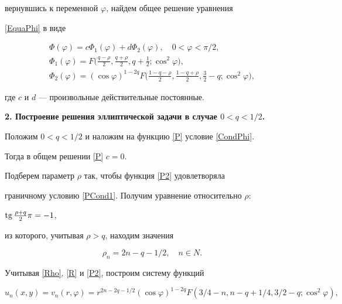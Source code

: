 вернувшись к переменной $\varphi$, найдем общее решение уравнения


\eqref{EquaPhi} в виде


\begin{gather}\label{P}


\Phi(\varphi)=c\Phi_1(\varphi)+d\Phi_2(\varphi),\quad 0<\varphi<\pi/2,\\


%


\label{P1}


\Phi_1(\varphi)=F\bigg(\frac{q-\rho}{2},\frac{q+\rho}{2},q+\frac{1}{2};


\cos^2\varphi\bigg),\\


%


\label{P2}


\Phi_2(\varphi)=(\cos\varphi)^{1-2q}F\bigg(\frac{1-q-\rho}{2},


\frac{1-q+\rho}{2},\frac{3}{2}-q;\cos^2\varphi\bigg),


\end{gather}


где $c$ и $d$ --- произвольные действительные постоянные.


\medskip





{\bf 2. Построение решения эллиптической задачи в случае $0<q<1/2$.}


Положим $0<q<1/2$ и наложим на функцию \eqref{P} условие \eqref{CondPhi}.


Тогда в общем решении \eqref{P} $c=0$.


Подберем параметр $\rho$ так, чтобы функция \eqref{P2} удовлетворяла


граничному условию \eqref{PCond1}. Получим уравнение относительно $\rho$:


$\operatorname{tg}\frac{\rho+q}{2}\pi = -1$,


из которого, учитывая $\rho>q$, находим значения


\begin{equation}\label{Rho}


\rho_n=2n-q-1/2,\quad n\in N.


\end{equation}





Учитывая \eqref{Rho}, \eqref{R} и \eqref{P2}, построим систему функций


\begin{equation}\label{SolveEn}


u_n(x,y)=v_n(r,\varphi)=


r^{2n-2q-1/2} (\cos\varphi)^{1-2q}


F({3/4-n},{n-q+1/4},{3/2-q};{\cos^2\varphi}),


\end{equation}


